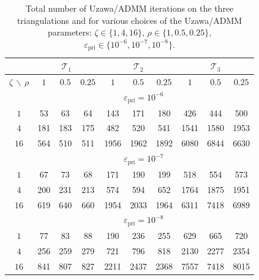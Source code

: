 \documentclass[a4paper,11pt]{article}
\theoremstyle{definition}
\theoremstyle{remark}
\numberwithin{equation}{section}
\begin{document}
\begin{table}[htb]
\centering
\begin{tabular}{|c|ccc|ccc|ccc|}
\hline
&\multicolumn{3}{|c|}{$\mathcal{T}_1$}&\multicolumn{3}{|c|}{$\mathcal{T}_2$}&\multicolumn{3}{|c|}{$\mathcal{T}_3$}\\ \hline
$\zeta\, \backslash\,\rho $ & $1$ &  $0.5$ &  $0.25$ & $1$ &  $0.5$ &  $0.25$ & $1$ &  $0.5$ &  $0.25$ \\
\hline
&\multicolumn{9}{|c|}{$\varepsilon_{\text{pri}}=10^{-6}$}\\\hline
$1$&\cellcolor{green!20}   53  & 63    & 64& \cellcolor{green!20}  143     &    171       &  180 &\cellcolor{green!20}    426    &     444     &    500\\
$4$&181    &     183    &     175 & 482       &  520      &   541 & 1541   &     1580       & 1953\\
$16$&564     &    510  &       511 & 1956  &      1962    &    1892 & 6080 &       6844    &    6630\\
\hline
&\multicolumn{9}{|c|}{$\varepsilon_{\text{pri}}=10^{-7}$}\\
\hline
$1$&\cellcolor{green!20}      67     &    73   &       68 & \cellcolor{green!20} 171     &    190    &     199& \cellcolor{green!20}518   &      554     &    573\\
$4$&200      &   231   &      213 & 574      &   594   &      652& 1764     &   1875     &   1951\\
$16$&619      &   640    &     660 & 1954    &    2033 &       1964 & 6311  &      7418     &   6989 \\
\hline
&\multicolumn{9}{|c|}{$\varepsilon_{\text{pri}}=10^{-8}$}\\
\hline
$1$& \cellcolor{green!20}77       &   83   &       88 & \cellcolor{green!20}190   &      236    &     255 &\cellcolor{green!20} 629   &      665    &     720\\
$4$& 256    &     259     &    279 & 721     &    796     &    818 & 2130      &  2277    &    2354\\
$16$& 841     &    807   &      827 & 2211     &   2437    &    2368& 7557     & 7418     &   8015\\
\hline
\end{tabular}
\caption{Total number of Uzawa/ADMM iterations on the three triangulations and for various choices of the Uzawa/ADMM parameters: $\zeta\in\{1,4,16\}$, $\rho\in\{1,0.5,0.25\}$, $\varepsilon_{\text{pri}} \in \{10^{-6},10^{-7},10^{-8}\}$.}
\label{Tab:Cu-Uzawa}
\end{table}
\end{document}
